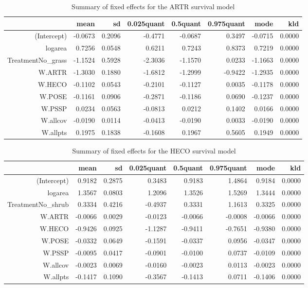 \begin{table}[ht]
\centering
\caption{Summary of fixed effects for the ARTR survival model} 
\label{ARTRsurvival}
\begin{tabular}{rrrrrrrr}
  \hline
 & mean & sd & 0.025quant & 0.5quant & 0.975quant & mode & kld \\ 
  \hline
(Intercept) & -0.0673 & 0.2096 & -0.4771 & -0.0687 & 0.3497 & -0.0715 & 0.0000 \\ 
  logarea & 0.7256 & 0.0548 & 0.6211 & 0.7243 & 0.8373 & 0.7219 & 0.0000 \\ 
  TreatmentNo\_grass & -1.1524 & 0.5928 & -2.3036 & -1.1570 & 0.0233 & -1.1663 & 0.0000 \\ 
  W.ARTR & -1.3030 & 0.1880 & -1.6812 & -1.2999 & -0.9422 & -1.2935 & 0.0000 \\ 
  W.HECO & -0.1102 & 0.0543 & -0.2101 & -0.1127 & 0.0035 & -0.1178 & 0.0000 \\ 
  W.POSE & -0.1161 & 0.0906 & -0.2871 & -0.1186 & 0.0690 & -0.1237 & 0.0000 \\ 
  W.PSSP & 0.0234 & 0.0563 & -0.0813 & 0.0212 & 0.1402 & 0.0166 & 0.0000 \\ 
  W.allcov & -0.0190 & 0.0114 & -0.0413 & -0.0190 & 0.0033 & -0.0190 & 0.0000 \\ 
  W.allpts & 0.1975 & 0.1838 & -0.1608 & 0.1967 & 0.5605 & 0.1949 & 0.0000 \\ 
   \hline
\end{tabular}
\end{table}

\begin{table}[ht]
\centering
\caption{Summary of fixed effects for the HECO survival model} 
\label{HECOsurvival}
\begin{tabular}{rrrrrrrr}
  \hline
 & mean & sd & 0.025quant & 0.5quant & 0.975quant & mode & kld \\ 
  \hline
(Intercept) & 0.9182 & 0.2875 & 0.3483 & 0.9183 & 1.4864 & 0.9184 & 0.0000 \\ 
  logarea & 1.3567 & 0.0803 & 1.2096 & 1.3526 & 1.5269 & 1.3444 & 0.0000 \\ 
  TreatmentNo\_shrub & 0.3334 & 0.4216 & -0.4937 & 0.3331 & 1.1613 & 0.3325 & 0.0000 \\ 
  W.ARTR & -0.0066 & 0.0029 & -0.0123 & -0.0066 & -0.0008 & -0.0066 & 0.0000 \\ 
  W.HECO & -0.9426 & 0.0925 & -1.1287 & -0.9411 & -0.7651 & -0.9380 & 0.0000 \\ 
  W.POSE & -0.0332 & 0.0649 & -0.1591 & -0.0337 & 0.0956 & -0.0347 & 0.0000 \\ 
  W.PSSP & -0.0095 & 0.0417 & -0.0901 & -0.0100 & 0.0737 & -0.0109 & 0.0000 \\ 
  W.allcov & -0.0023 & 0.0069 & -0.0160 & -0.0023 & 0.0113 & -0.0023 & 0.0000 \\ 
  W.allpts & -0.1417 & 0.1090 & -0.3567 & -0.1413 & 0.0711 & -0.1406 & 0.0000 \\ 
   \hline
\end{tabular}
\end{table}

